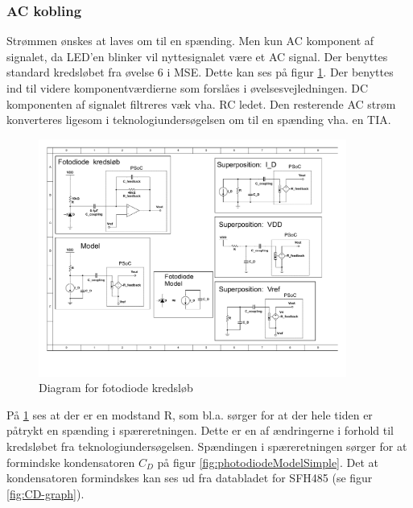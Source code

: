 \documentclass[HardwareDesign/HardwareDesign_main.tex]{subfiles}
\begin{document}
\subsubsection{AC kobling} \label{sec:CupSensorACCoupling}
Strømmen ønskes at laves om til en spænding. Men kun AC komponent af signalet, da LED'en blinker vil nyttesignalet være et AC signal. Der benyttes standard kredsløbet fra øvelse 6 i MSE\autocite{MSE_EXC_6}. Dette kan ses på figur \ref{fig:photodiodeCircuit}. Der benyttes ind til videre komponentværdierne som forslåes i øvelsesvejledningen.   DC komponenten af signalet filtreres væk vha. RC ledet. Den resterende AC strøm konverteres ligesom i teknologiundersøgelsen om til en spænding vha. en TIA. 
\begin{figure}[H]
    \centering
    \includegraphics[width=0.9\textwidth,trim={0.6in 5.1in 6.0in 0.55in},clip, page=1]{HardwareDesign/CupSensor/graphics/Superposition.pdf}
    \caption{Diagram for fotodiode kredsløb}
    \label{fig:photodiodeCircuit}
\end{figure}
På \ref{fig:photodiodeCircuit} ses at der er en modstand R, som bl.a. sørger for at der hele tiden er påtrykt en spænding i spæreretningen. Dette er en af ændringerne i forhold til kredsløbet fra teknologiundersøgelsen. Spændingen i spæreretningen sørger for at formindske kondensatoren $C_D$ på figur \ref{fig:photodiodeModelSimple}. Det at kondensatoren formindskes kan ses ud fra databladet for SFH485 (se figur \ref{fig:CD-graph}).
\end{document}
